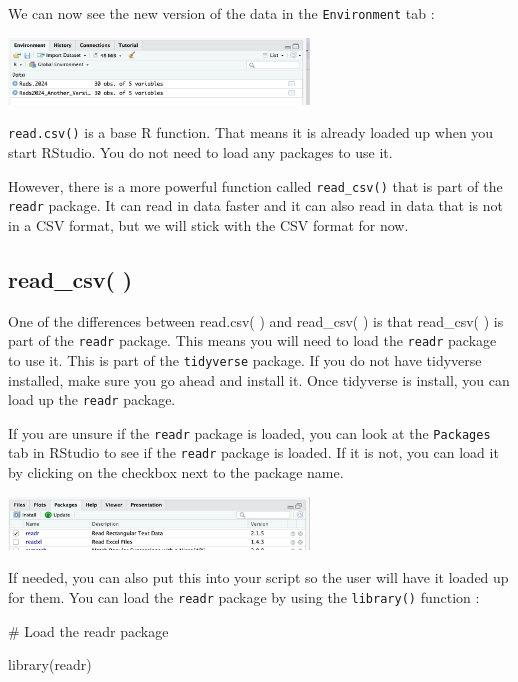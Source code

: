 \documentclass[
  letterpaper,
  DIV=11,
  numbers=noendperiod]{scrreprt}
\newenvironment{Shaded}{\begin{snugshade}}{\end{snugshade}}
\newcommand{\CommentTok}[1]{\textcolor[rgb]{0.37,0.37,0.37}{#1}}
\newcommand{\FunctionTok}[1]{\textcolor[rgb]{0.28,0.35,0.67}{#1}}
\newcommand{\NormalTok}[1]{\textcolor[rgb]{0.00,0.23,0.31}{#1}}
\begin{document}
We can now see the new version of the data in the \texttt{Environment}
tab :

\includegraphics[width=0.6\textwidth,height=\textheight]{./images/Read-In-Data-9.jpg}

\texttt{read.csv()} is a base R function. That means it is already
loaded up when you start RStudio. You do not need to load any packages
to use it.

However, there is a more powerful function called \texttt{read\_csv()}
that is part of the \texttt{readr} package. It can read in data faster
and it can also read in data that is not in a CSV format, but we will
stick with the CSV format for now.

\subsection*{read\_csv( )}\label{read_csv}

One of the differences between read.csv( ) and read\_csv( ) is that
read\_csv( ) is part of the \texttt{readr} package. This means you will
need to load the \texttt{readr} package to use it. This is part of the
\texttt{tidyverse} package. If you do not have tidyverse installed, make
sure you go ahead and install it. Once tidyverse is install, you can
load up the \texttt{readr} package.

If you are unsure if the \texttt{readr} package is loaded, you can look
at the \texttt{Packages} tab in RStudio to see if the \texttt{readr}
package is loaded. If it is not, you can load it by clicking on the
checkbox next to the package name.

\includegraphics[width=0.6\textwidth,height=\textheight]{./images/Read-In-Data-10.jpg}

If needed, you can also put this into your script so the user will have
it loaded up for them. You can load the \texttt{readr} package by using
the \texttt{library()} function :

\begin{Shaded}
\begin{Highlighting}[]
\CommentTok{\# Load the readr package}

\FunctionTok{library}\NormalTok{(readr)}
\end{Highlighting}
\end{Shaded}
\end{document}

